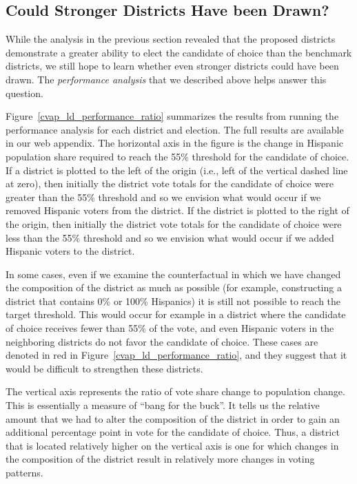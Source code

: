 \documentclass[12pt]{article}
\begin{document}
\subsection{Could Stronger Districts Have been Drawn?}

While the analysis in the previous section revealed that the proposed districts
demonstrate a greater ability to elect the candidate of choice than the benchmark districts, 
we still hope to learn whether even stronger districts could have been drawn.
The \emph{performance analysis} that we described above helps answer this question.

Figure~\ref{cvap_ld_performance_ratio} summarizes the results from
running the performance analysis for each district and election.
The full results are available in our web appendix. The horizontal
axis in the figure is the change in Hispanic population share required
to reach the 55\% threshold for the candidate of choice. If a district
is plotted to the left of the origin (i.e., left of the vertical
dashed line at zero), then initially the district vote totals for the
candidate of choice were greater than the 55\% threshold and so we
envision what would occur if we removed Hispanic voters from the
district. If the district is plotted to the right of the origin, then
initially the district vote totals for the candidate of choice were
less than the 55\% threshold and so we envision what would occur if we
added Hispanic voters to the district.

In some cases, even if we examine the counterfactual in which we have
changed the composition of the district as much as possible (for
example, constructing a district that contains 0\% or 100\% Hispanics)
it is still not possible to reach the target threshold. This would
occur for example in a district where the candidate of choice receives
fewer than 55\% of the vote, and even Hispanic voters in the
neighboring districts do not favor the candidate of choice. These cases 
are denoted in red in Figure~\ref{cvap_ld_performance_ratio}, and they suggest
that it would be difficult to strengthen these districts.

The vertical axis represents the ratio of vote share change to
population change. This is essentially a measure of ``bang for the
buck''. It tells us the relative amount that we had to alter the
composition of the district in order to gain an additional percentage
point in vote for the candidate of choice. Thus, a district that is
located relatively higher on the vertical axis is one for which
changes in the composition of the district result in relatively more
changes in voting patterns.
\end{document}
